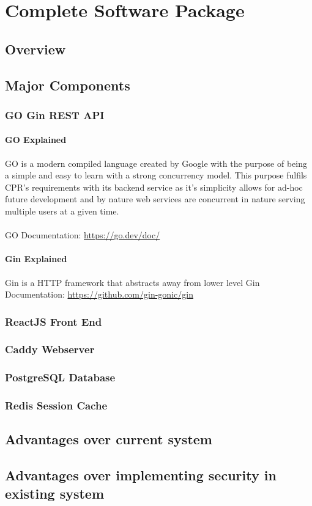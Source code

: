 \documentclass[12pt]{article}
\begin{document}
    \section{Complete Software Package}\label{sec:entire-software-package}

    \subsection{Overview}\label{subsec:overview}

    \subsection{Major Components}\label{subsec:major-components}
    \subsubsection{GO Gin REST API}

    \paragraph{GO Explained}
    GO is a modern compiled language created by Google with the purpose of being a simple and easy to learn with a strong concurrency model.
    This purpose fulfils CPR's requirements with its backend service as it's simplicity allows for ad-hoc future development and by nature web services
    are concurrent in nature serving multiple users at a given time.

    \paragraph{} GO Documentation: \url{https://go.dev/doc/}

    \paragraph{Gin Explained}
    Gin is a HTTP framework that abstracts away from lower level
    Gin Documentation: \url{https://github.com/gin-gonic/gin}
    \subsubsection{ReactJS Front End}
    \subsubsection{Caddy Webserver}
    \subsubsection{PostgreSQL Database}
    \subsubsection{Redis Session Cache}

    \subsection{Advantages over current system}\label{subsec:advantages-over-current-system}
    \subsection{Advantages over implementing security in existing system}\label{subsec:advantages-over-implementing-security-in-existing-system}
\end{document}
